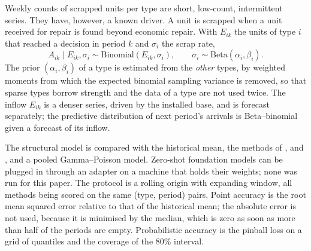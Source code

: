 Weekly counts of scrapped units per type are short, low-count, intermittent series. They have, however, a known
driver. A unit is scrapped when a unit received for repair is found beyond economic repair. With $E_{ik}$ the units
of type $i$ that reached a decision in period $k$ and $\sigma_i$ the scrap rate,
\begin{equation}\label{eq:structural}
A_{ik}\mid E_{ik},\sigma_i\sim\mathrm{Binomial}(E_{ik},\sigma_i),\qquad\sigma_i\sim\mathrm{Beta}(\alpha_i,\beta_i).
\end{equation}
The prior $(\alpha_i,\beta_i)$ of a type is estimated from the \emph{other} types, by weighted moments from which
the expected binomial sampling variance is removed, so that sparse types borrow strength and the data of a type are
not used twice. The inflow $E_{ik}$ is a denser series, driven by the installed base, and is forecast separately;
the predictive distribution of next period's arrivals is Beta--binomial given a forecast of its inflow.

The structural model is compared with the historical mean, the methods of \citet{croston1972},
\citet{syntetos2005} and \citet{teunter2011}, and a pooled Gamma--Poisson model. Zero-shot foundation models can be
plugged in through an adapter on a machine that holds their weights; none was run for this paper. The protocol is a
rolling origin with expanding window, all methods being scored on the same (type, period) pairs. Point accuracy is
the root mean squared error relative to that of the historical mean; the absolute error is not used, because it is
minimised by the median, which is zero as soon as more than half of the periods are empty. Probabilistic accuracy
is the pinball loss on a grid of quantiles and the coverage of the 80\% interval.
